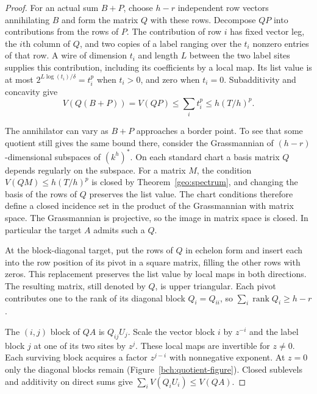 \begin{proof}
For an actual sum $B+P$, choose $h-r$ independent row vectors
annihilating $B$ and form the matrix $Q$ with these rows. Decompose
$QP$ into contributions from the rows of $P$. The contribution of
row $i$ has fixed vector leg, the $i$th column of $Q$, and two copies
of a label ranging over the $t_i$ nonzero entries of that row.
A wire of dimension $t_i$ and length $L$ between the two label
sites supplies this contribution, including its coefficients by a local
map. Its list value is at most $2^{L\log(t_i)/\delta}=t_i^p$ when
$t_i>0$, and zero when $t_i=0$. Subadditivity and concavity give
\[
 V(Q(B+P))=V(QP)
    \le\sum_i t_i^p\le h(T/h)^p .
\]

The annihilator can vary as $B+P$ approaches a border point. To see
that some quotient still gives the same bound there, consider the
Grassmannian of $(h-r)$-dimensional subspaces of $(k^h)^*$.
On each standard chart a basis matrix $Q$ depends regularly on the
subspace. For a matrix $M$, the condition $V(QM)\le h(T/h)^p$ is closed
by Theorem~\ref{geo:spectrum}, and changing the basis of the rows of
$Q$ preserves the list value. The chart conditions therefore define
a closed incidence set in the product of the Grassmannian with matrix
space. The Grassmannian is projective, so the image in matrix space
is closed. In particular the target $A$ admits such a $Q$.

At the block-diagonal target, put the rows of $Q$ in echelon form
and insert each into the row position of its pivot in a square matrix,
filling the other rows with zeros. This replacement preserves the list
value by local maps in both directions. The resulting matrix, still
denoted by $Q$, is upper triangular. Each pivot contributes one to
the rank of its diagonal block $Q_i=Q_{ii}$, so
$\sum_i\operatorname{rank}Q_i\ge h-r$.

The $(i,j)$ block of $QA$ is $Q_{ij}U_j$. Scale the vector block $i$
by $z^{-i}$ and the label block $j$ at one of its two sites by $z^j$.
These local maps are invertible for $z\ne0$. Each surviving block
acquires a factor $z^{j-i}$ with nonnegative exponent. At $z=0$ only
the diagonal blocks remain (Figure~\ref{bch:quotient-figure}). Closed
sublevels and additivity on direct sums give
$\sum_i V(Q_iU_i)\le V(QA)$.
\end{proof}

